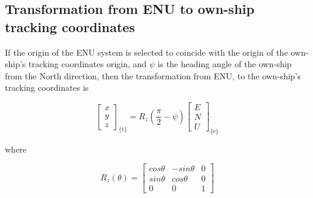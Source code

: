 \subsection{Transformation from ENU to own-ship tracking coordinates}


If the origin of the ENU system is selected to coincide with the origin of the own-ship's tracking coordinates origin, and $\psi$ is the heading angle of the own-ship from the North direction, then the transformation from ENU, to the own-ship's tracking coordinates is





\begin{equation}
\begin{bmatrix}
x \\
y \\
z
\end{bmatrix}_{\text{\{t\}}} = R_{z}(\frac{\pi}{2}-\psi)
\begin{bmatrix}
E \\
N \\
U
\end{bmatrix}_{\text{\{e\}}}
\end{equation}

where

$$
R_{z}(\theta)=\begin{bmatrix}
cos\theta &-sin\theta &0\\
sin\theta &cos\theta &0 \\
0 &0 &1
\end{bmatrix}
$$

%
